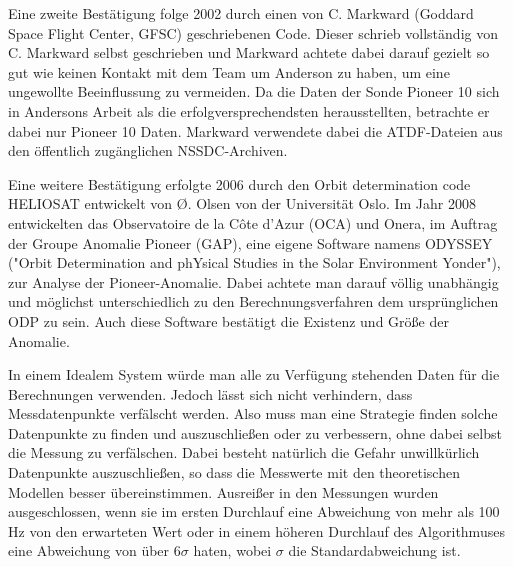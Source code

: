 Eine zweite Bestätigung folge 2002 durch einen von C. Markward (Goddard Space Flight Center, GFSC) geschriebenen
Code. Dieser schrieb vollständig von C. Markward selbst geschrieben und Markward achtete dabei darauf gezielt so gut wie keinen Kontakt mit dem Team um Anderson zu haben, um eine ungewollte Beeinflussung zu vermeiden.\cite{Markwardt2002} Da die Daten der Sonde Pioneer 10 sich in Andersons Arbeit als die erfolgversprechendsten herausstellten, betrachte er dabei nur Pioneer 10 Daten.\cite{Markwardt2002}
Markward verwendete dabei die ATDF-Dateien aus den öffentlich zugänglichen NSSDC-Archiven.

Eine weitere Bestätigung erfolgte 2006 durch den Orbit determination code HELIOSAT entwickelt von Ø. Olsen von der
Universität Oslo.
Im Jahr 2008 entwickelten das Observatoire de la Côte d’Azur (OCA) und Onera, im Auftrag der Groupe Anomalie Pioneer (GAP),
eine eigene Software namens ODYSSEY ("Orbit Determination and phYsical Studies in the Solar Environment Yonder"), zur Analyse der Pioneer-Anomalie.
Dabei achtete man darauf völlig unabhängig und möglichst unterschiedlich zu den Berechnungsverfahren dem ursprünglichen ODP zu sein. 
Auch diese Software bestätigt die Existenz und Größe der Anomalie.\cite{Levy2008}


In einem Idealem System würde man alle zu Verfügung stehenden Daten für die Berechnungen verwenden. Jedoch lässt sich nicht verhindern, dass Messdatenpunkte verfälscht werden. Also muss man eine Strategie finden solche Datenpunkte zu finden und auszuschließen oder zu verbessern, ohne dabei selbst die Messung zu verfälschen. Dabei besteht natürlich die Gefahr unwillkürlich Datenpunkte auszuschließen, so dass die Messwerte mit den theoretischen Modellen besser übereinstimmen.
Ausreißer in den Messungen wurden ausgeschlossen, wenn sie im ersten Durchlauf eine Abweichung von mehr als 100 Hz von den erwarteten Wert oder in einem höheren Durchlauf des Algorithmuses eine Abweichung von über $6\sigma$ haten, wobei $\sigma$ die Standardabweichung ist.\cite{Levy2008} %
